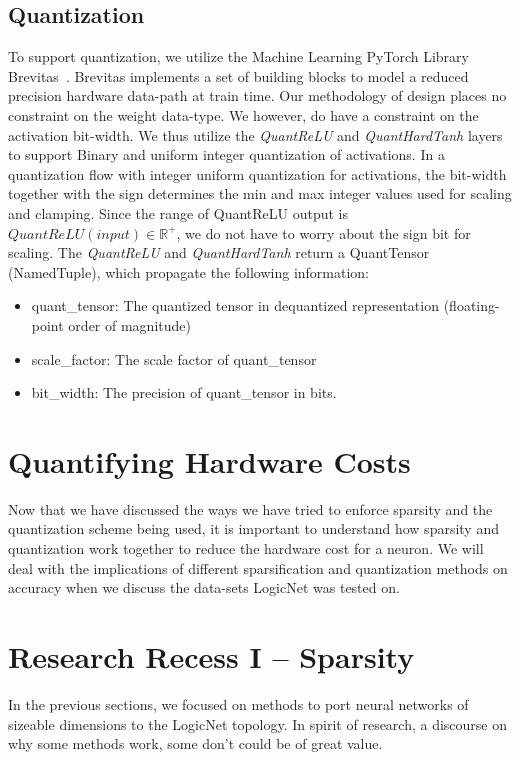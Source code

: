     
\subsection{Quantization}
To support quantization, we utilize the Machine Learning PyTorch Library Brevitas~\cite{alessandro_pappalardo_2019_3525102}. Brevitas implements a set of building blocks to model a reduced precision hardware data-path at train time. Our methodology of design places no constraint on the weight data-type. We however, do have a constraint on the activation bit-width. We thus utilize the \textit{QuantReLU} and \textit{QuantHardTanh} layers to support Binary and uniform integer quantization of activations.
In a quantization flow with integer uniform quantization for activations, the bit-width together with the sign determines the min and max integer values used for scaling and clamping. Since the range of QuantReLU output is $QuantReLU(input) \in \mathbb{R}^{+}$, we do not have to worry about the sign bit for scaling. The \textit{QuantReLU} and \textit{QuantHardTanh} return a QuantTensor (NamedTuple), which propagate the following information:
\begin{itemize}
    \item quant\_tensor: The quantized tensor in dequantized representation (floating-point order of magnitude)
    \item scale\_factor: The scale factor of quant\_tensor
    \item bit\_width: The precision of quant\_tensor in bits.
\end{itemize}

\section{Quantifying Hardware Costs}
Now that we have discussed the ways we have tried to enforce sparsity and the quantization scheme being used, it is important to understand how sparsity and quantization work together to reduce the hardware cost for a neuron. We will deal with the implications of different sparsification and quantization methods on accuracy when we discuss the data-sets LogicNet was tested on.

\section{Research Recess  I -- Sparsity}

In the previous sections, we focused on methods to port neural networks of sizeable dimensions to the LogicNet topology. In spirit of research, a discourse on why some methods work, some don't could be of great value. 

